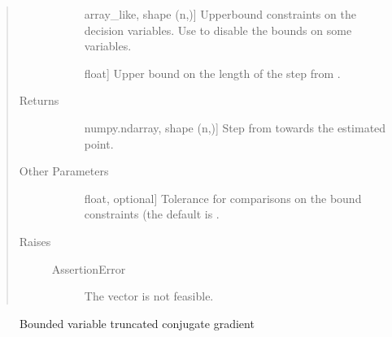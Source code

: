 \documentclass[letterpaper,10pt,english]{sphinxmanual}
\begin{document}
\begin{fulllineitems}
\begin{quote}
\begin{description}
\begin{description}
\item[{}] \leavevmode{[}array\_like, shape (n,){]}
\sphinxAtStartPar
Upper\sphinxhyphen{}bound constraints on the decision variables. Use  to
disable the bounds on some variables.

\item[{}] \leavevmode{[}float{]}
\sphinxAtStartPar
Upper bound on the length of the step from .

\end{description}

\item[{Returns}] \leavevmode\begin{description}
\item[{}] \leavevmode{[}numpy.ndarray, shape (n,){]}
\sphinxAtStartPar
Step from  towards the estimated point.

\end{description}

\item[{Other Parameters}] \leavevmode\begin{description}
\item[{}] \leavevmode{[}float, optional{]}
\sphinxAtStartPar
Tolerance for comparisons on the bound constraints (the default is
.

\end{description}

\item[{Raises}] \leavevmode\begin{description}
\item[{AssertionError}] \leavevmode
\sphinxAtStartPar
The vector  is not feasible.

\end{description}

\end{description}\end{quote}


\nopagebreak

\begin{description}
\item[{{\hyperref[\detokenize{refs/generated/cobyqa.linalg.bvtcg:cobyqa.linalg.bvtcg}]{}}}] \leavevmode
\sphinxAtStartPar
Bounded variable truncated conjugate gradient


\end{description}
\end{fulllineitems}
\end{document}

